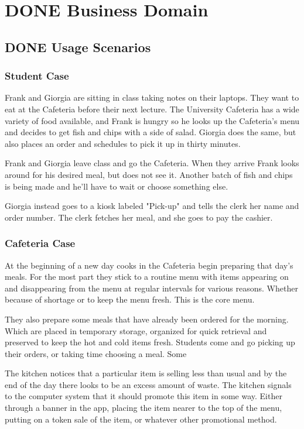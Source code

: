 \documentclass[11pt]{article}
\begin{document}
\section{{\bfseries\sffamily DONE} Business Domain}
\label{sec:orgbb64f8f}
\subsection{{\bfseries\sffamily DONE} Usage Scenarios}
\label{sec:orgd13d316}
\subsubsection{Student Case}
\label{sec:orgaf953c4}
Frank and Giorgia are sitting in class taking notes on their
laptops. They want to eat at the Cafeteria before their next
lecture. The University Cafeteria has a wide variety of food
available, and Frank is hungry so he looks up the Cafeteria's menu
and decides to get fish and chips with a side of salad. Giorgia
does the same, but also places an order and schedules to pick it
up in thirty minutes.

Frank and Giorgia leave class and go the Cafeteria. When they
arrive Frank looks around for his desired meal, but does not see
it. Another batch of fish and chips is being made and he'll have
to wait or choose something else. 

Giorgia instead goes to a kiosk labeled "Pick-up" and tells the
clerk her name and order number. The clerk fetches her meal, and
she goes to pay the cashier.
\subsubsection{Cafeteria Case}
\label{sec:orgf8b7769}
At the beginning of a new day cooks in the Cafeteria begin
preparing that day's meals. For the most part they stick to a
routine menu with items appearing on and disappearing from the
menu at regular intervals for various reasons. Whether because of
shortage or to keep the menu fresh. This is the core menu.

They also prepare some meals that have already been ordered for
the morning. Which are placed in temporary storage, organized for
quick retrieval and preserved to keep the hot and cold items
fresh. Students come and go picking up their orders, or taking
time choosing a meal. Some 

The kitchen notices that a particular item is selling less than
usual and by the end of the day there looks to be an excess amount
of waste. The kitchen signals to the computer system that it
should promote this item in some way. Either through a banner in
the app, placing the item nearer to the top of the menu, putting
on a token sale of the item, or whatever other promotional
method.
\end{document}
